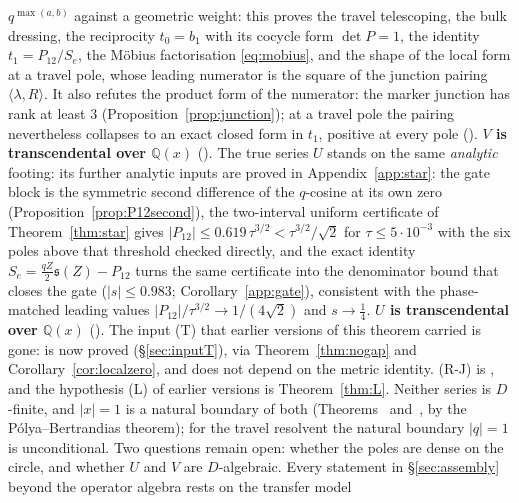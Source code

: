 \documentclass[11pt]{article}
\theoremstyle{plain}
\theoremstyle{definition}
\theoremstyle{remark}
\newcommand{\Q}{\mathbb{Q}}
\begin{document}
$q^{\max(a,b)}$ against a geometric weight: this proves the travel telescoping, the bulk dressing,
the reciprocity $t_0=b_1$ with its cocycle form $\det P=1$, the identity $t_1=P_{12}/S_e$, the
M\"obius factorisation \eqref{eq:mobius}, and the shape of the local form at a travel pole, whose
leading numerator is the square of the junction pairing $\langle\lambda,R\rangle$. It
also refutes the product form of the numerator: the marker junction has rank at least $3$
(Proposition~\ref{prop:junction}); at a travel pole the pairing nevertheless collapses to an exact
closed form in $t_1$, positive at every pole ({\cite[Theorem ``closed form of the junction pairing'', \textup{thm:RJ}]{Bonfioli2026bA}}). \textbf{$V$ is transcendental
over $\Q(x)$} ({\cite[Theorem \textup{thm:V}]{Bonfioli2026bA}}). The true series $U$ stands on the same
\emph{analytic} footing: its further analytic inputs are proved in Appendix~\ref{app:star}: the gate block is the
symmetric second difference of the $q$-cosine at its own zero (Proposition~\ref{prop:P12second}),
the two-interval uniform certificate of Theorem~\ref{thm:star} gives
$|P_{12}|\le0.619\,\tau^{3/2}<\tau^{3/2}/\sqrt2$ for $\tau\le5\cdot10^{-3}$ with the six poles
above that threshold checked directly, and the exact identity $S_e=\tfrac{qZ}2\mathfrak s(Z)-P_{12}$ turns the
same certificate into the denominator bound that closes the gate
($|s|\le0.983$; Corollary~\ref{app:gate}), consistent with the phase-matched leading
values $|P_{12}|/\tau^{3/2}\to1/(4\sqrt2)$ and $s\to\tfrac14$.
\textbf{$U$ is transcendental over $\Q(x)$} ({\cite[Theorem \textup{thm:U}]{Bonfioli2026bA}}). The input
\textup{(T)} that earlier versions of this theorem carried is gone: {\cite[Proposition ``Invariance of the travel block'', \textup{prop:travelinv}]{Bonfioli2026bA}}
is now proved (\S\ref{sec:inputT}), via Theorem~\ref{thm:nogap} and Corollary~\ref{cor:localzero},
and does not depend on the metric identity. \textup{(R-J)} is
{\cite[Theorem ``closed form of the junction pairing'', \textup{thm:RJ}]{Bonfioli2026bA}}, and the hypothesis \textup{(L)} of earlier versions is Theorem~\ref{thm:L}. Neither series is $D$-finite,
and $|x|=1$ is a natural boundary of both (Theorems~{\cite[\textup{thm:nonDfinite}]{Bonfioli2026bA}} and~{\cite[\textup{thm:natboundary}]{Bonfioli2026bA}},
by the P\'olya--Bertrandias theorem); for the travel resolvent the natural boundary $|q|=1$ is
unconditional. Two questions remain open: whether the poles are dense on the circle, and whether
$U$ and $V$ are $D$-algebraic.
Every statement in \S\ref{sec:assembly} beyond the operator algebra rests on the transfer model
\end{document}
